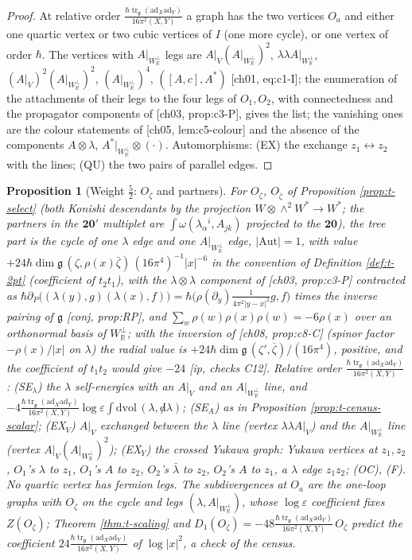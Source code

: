 \documentclass[11pt]{report}
\theoremstyle{plain}
\newtheorem{proposition}[theorem]{Proposition}
\theoremstyle{definition}
\numberwithin{equation}{chapter}
\newcommand{\unit}{\tfrac{\hbar\operatorname{tr}_{\mathfrak g}(\mathrm{ad}_X\mathrm{ad}_Y)}{16\pi^2(X,Y)}}
\newcommand{\Wp}{W_{\mathbb R}^\perp}
\begin{document}
\begin{proof}
At relative order $\unit$ a graph has the two vertices $O_a$ and either one quartic vertex or two cubic vertices of $I$ (one more cycle), or one vertex of order $\hbar$. The vertices with $A|_{\Wp}$ legs are $A|_V(A|_{\Wp})^2$, $\lambda\lambda A|_{\Wp}$, $(A|_V)^2(A|_{\Wp})^2$, $(A|_{\Wp})^4$, $([A,c],A^*)$ [ch01, eq:c1-I]; the enumeration of the attachments of their legs to the four legs of $O_1,O_2$, with connectedness and the propagator components of [ch03, prop:c3-P], gives the list; the vanishing ones are the colour statements of [ch05, lem:c5-colour] and the absence of the components $A\otimes\lambda$, $A^*|_{\Wp}\otimes(\cdot)$. Automorphisms: (EX) the exchange $z_1\leftrightarrow z_2$ with the lines; (QU) the two pairs of parallel edges.
\end{proof}

\begin{proposition}[Weight $\tfrac52$: $O_\zeta$ and partners]
\label{prop:t-census-zeta}
For $O_\zeta$, $O_{\bar\zeta}$ of Proposition \ref{prop:t-select} (both Konishi descendants by the projection $W\otimes\wedge^2W^*\to W^*$; the partners in the $\mathbf{20'}$ multiplet are $\int\omega(\lambda_\alpha{}^i,A_{jk})$ projected to the $\mathbf{20}$), the tree part is the cycle of one $\lambda$ edge and one $A|_{\Wp}$ edge, $|\mathrm{Aut}|=1$, with value $+24\hbar\dim\mathfrak g\,(\zeta,\rho(x)\bar\zeta)\,(16\pi^4)^{-1}|x|^{-6}$ in the convention of Definition \ref{def:t-2pt} (coefficient of $t_2t_1$), with the $\lambda\otimes\lambda$ component of [ch03, prop:c3-P] contracted as $\hbar\partial_P\big((\lambda(y),g)(\lambda(x),f)\big)=\hbar\big(\rho(\partial_y)\tfrac1{4\pi^2|y-x|^2}g,f\big)$ times the inverse pairing of $\mathfrak g$ [conj, prop:RP], and $\sum_w\rho(w)\rho(x)\rho(w)=-6\rho(x)$ over an orthonormal basis of $\Wp$; with the inversion of [ch08, prop:c8-C] (spinor factor $-\rho(x)/|x|$ on $\lambda$) the radial value is $+24\hbar\dim\mathfrak g\,(\zeta',\overline\zeta)/(16\pi^4)$, positive, and the coefficient of $t_1t_2$ would give $-24$ [ip, checks C12]. Relative order $\unit$: (SE$_\lambda$) the $\lambda$ self-energies with an $A|_V$ and an $A|_{\Wp}$ line, and $-4\unit\log\varepsilon\int\mathrm{dvol}\,(\lambda,{\not d}\lambda)$; (SE$_A$) as in Proposition \ref{prop:t-census-scalar}; (EX$_V$) $A|_V$ exchanged between the $\lambda$ line (vertex $\lambda\lambda A|_V$) and the $A|_{\Wp}$ line (vertex $A|_V(A|_{\Wp})^2$); (EX$_Y$) the crossed Yukawa graph: Yukawa vertices at $z_1,z_2$, $O_1$'s $\lambda$ to $z_1$, $O_1$'s $A$ to $z_2$, $O_2$'s $\bar\lambda$ to $z_2$, $O_2$'s $A$ to $z_1$, a $\lambda$ edge $z_1z_2$; (OC), (F). No quartic vertex has fermion legs. The subdivergences at $O_a$ are the one-loop graphs with $O_\zeta$ on the cycle and legs $(\lambda,A|_{\Wp})$, whose $\log\varepsilon$ coefficient fixes $Z(O_\zeta)$; Theorem \ref{thm:t-scaling} and $D_1(O_\zeta)=-48\unit\,O_\zeta$ predict the coefficient $24\unit$ of $\log|x|^2$, a check of the census.
\end{proposition}
\end{document}
